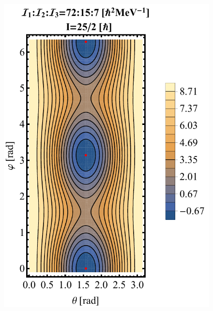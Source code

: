 \documentclass[%
 reprint,
 amsmath,
 amssymb,
 aps,
 floatfix,
]{revtex4-2}
\begin{document}
\begin{figure}
    \centering
    \includegraphics[scale=0.55]{images/contour-tsd1.pdf}

\end{figure}
\end{document}

